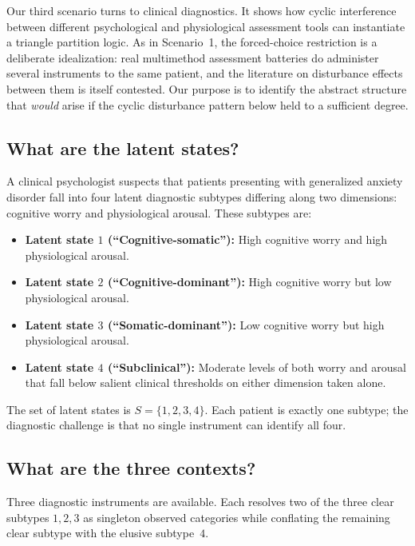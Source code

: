 \documentclass{article}
\begin{document}
Our third scenario turns to clinical diagnostics. It shows how
cyclic interference between different psychological and physiological
assessment tools can instantiate a triangle partition logic. As in
Scenario~1, the forced-choice restriction is a deliberate
idealization: real multimethod assessment batteries do administer
several instruments to the same patient, and the literature on
disturbance effects between them is itself contested. Our purpose is
to identify the abstract structure that \emph{would} arise if the
cyclic disturbance pattern below held to a sufficient degree.

\subsection{What are the latent states?}

A clinical psychologist suspects that patients presenting with
generalized anxiety disorder fall into four latent diagnostic
subtypes differing along two dimensions: cognitive worry and
physiological arousal. These subtypes are:
\begin{itemize}
\item \textbf{Latent state $1$ (``Cognitive-somatic''):} High
cognitive worry and high physiological arousal.
\item \textbf{Latent state $2$ (``Cognitive-dominant''):} High
cognitive worry but low physiological arousal.
\item \textbf{Latent state $3$ (``Somatic-dominant''):} Low
cognitive worry but high physiological arousal.
\item \textbf{Latent state $4$ (``Subclinical''):} Moderate levels
of both worry and arousal that fall below salient clinical
thresholds on either dimension taken alone.
\end{itemize}
The set of latent states is $S=\{1,2,3,4\}$. Each patient is exactly
one subtype; the diagnostic challenge is that no single instrument
can identify all four.

\subsection{What are the three contexts?}

Three diagnostic instruments are available. Each resolves two of the
three clear subtypes $1,2,3$ as singleton observed categories while
conflating the remaining clear subtype with the elusive subtype~$4$.
\end{document}
